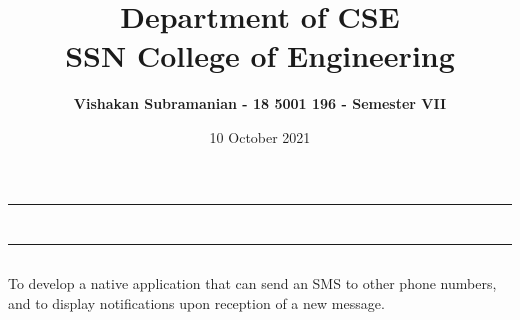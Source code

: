 \documentclass[12pt, a4]{article}
\title{\textbf{Department of CSE\\SSN College of Engineering}}
\author{\textbf{Vishakan Subramanian - 18 5001 196 - Semester VII}}
\date{10 October 2021}
\begin{document}
\maketitle
\hrule
\section*{}
\hrule
\bigskip

\subsection*{}
\subsection*{}
\begin{flushleft}

To develop a native application that can send an SMS to other phone numbers, and to display notifications upon reception of a new message.

\end{flushleft}

\newpage
\subsection*{}
\begin{flushleft}

\end{flushleft}

\newpage
\subsection*{}
\begin{flushleft}

\end{flushleft}


\newpage
\subsection*{}
\begin{flushleft}

\end{flushleft}
\end{document}
